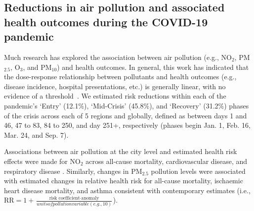 \documentclass[preprint,10pt]{elsarticle} %
\begin{document}
\subsection*{Reductions in air pollution and associated health outcomes during the COVID-19 pandemic}
Much research has explored the association between air pollution (e.g., NO$_{2}$, PM$_{2.5}$, O$_{3}$, and PM$_{10}$) and health outcomes. In general, this work has indicated that the dose-response relationship between pollutants and health outcomes (e.g., disease incidence, hospital presentations, etc.) is generally linear, with no evidence of a threshold~\cite{schwartz2002concentration}. We estimated risk reductions within each of the pandemic's `Entry' (12.1\%), `Mid-Crisis' (45.8\%), and `Recovery' (31.2\%) phases of the crisis across each of 5 regions and globally,  defined as between days 1 and 46, 47 to 83, 84 to 250, and day 251+, respectively (phases begin Jan. 1, Feb. 16, Mar. 24, and Sep. 7). 

Associations between air pollution at the city level and estimated health risk effects were made for NO$_{2}$ across all-cause mortality, cardiovascular disease, and respiratory disease \cite{Huang19Pollution}. Similarly, changes in PM$_{2.5}$ pollution levels were associated with estimated changes in relative health risk for all-cause mortality, ischaemic heart disease mortality, and asthma consistent with contemporary estimates \cite{Xie257, Yu2020PM2.5, BALTI2014161} (i.e., \( \mathrm{RR} = 1 + \frac{\text{risk coefficient} \cdot \text{anomaly}}{units of pollution variable (e.g., 10)} \)). 
\end{document}
